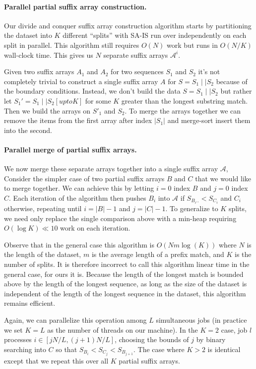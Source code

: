 \paragraph{Parallel partial suffix array construction.}
%
Our divide and conquer suffix array construction algorithm starts by 
partitioning the dataset into $K$ different ``splits'' with SA-IS run
over independently on each split in parallel.
%
This algorithm still requires $O(N)$ work but runs in $O(N/K)$ wall-clock time.
%
This gives us $N$ separate suffix arrays $\mathcal{A}^i$.

Given two suffix arrays $A_1$ and $A_2$ for two sequences $S_1$ and $S_2$ it's not completely trivial to construct a single suffix array $A$ for $S = S_1 \mid\mid S_2$ 
because of the boundary conditions.
Instead, we don't build the data $S = S_1 \mid\mid S_2$ but rather let $S_1' = S_1 \mid\mid S_2[upto K]$ for some $K$ greater than the longest substring match.
Then we build the arrays on $S'_1$ and $S_2$.
To merge the arrays together we can remove the items from the first array after index $|S_1|$ and merge-sort insert them into the second.

\paragraph{Parallel merge of partial suffix arrays.}
We now merge these separate arrays together into a single suffix array $\mathcal{A}$,
%
Consider the simpler case of two partial suffix arrays $B$ and $C$ that we 
would like to merge together.
%
We can achieve this by letting $i=0$ index $B$ and $j=0$ index $C$.
%
Each iteration of the algorithm then pushes $B_i$ into $\mathcal{A}$ if
$S_{B_i..} < S_{C_i}$ and $C_i$ otherwise, repeating until $i=|B|-1$ and $j=|C|-1$.
%
To generalize to $K$ splits, we need only replace the single comparison above with
a min-heap requiring $O(\log{K}) \ll 10$ work on each iteration.

Observe that in the general case this algorithm is $O(N m \log(K))$ where $N$ is the length
of the dataset, $m$ is the average length of a prefix match, and $K$ is the number of splits.
%
It is therefore incorrect to call this algorithm linear time in the general case, for ours it is.
%
Because the length of the longest match is bounded above by the length of the longest
sequence, as long as the size of the dataset is independent of the length of the 
longest sequence in the dataset, this algorithm remains efficient.

Again, we can parallelize this operation among $L$ simultaneous jobs 
(in practice we set $K=L$ as the number of threads on our machine).
%
In the $K=2$ case, job $l$ processes $i \in [jN/L, (j+1)N/L]$, choosing
the bounds of $j$ by binary searching into $C$ so that $S_{B_{i}} < S_{C_{j}} < S_{B_{j+1}}$.
%
The case where $K>2$ is identical except that we repeat this over all $K$ partial suffix arrays.


